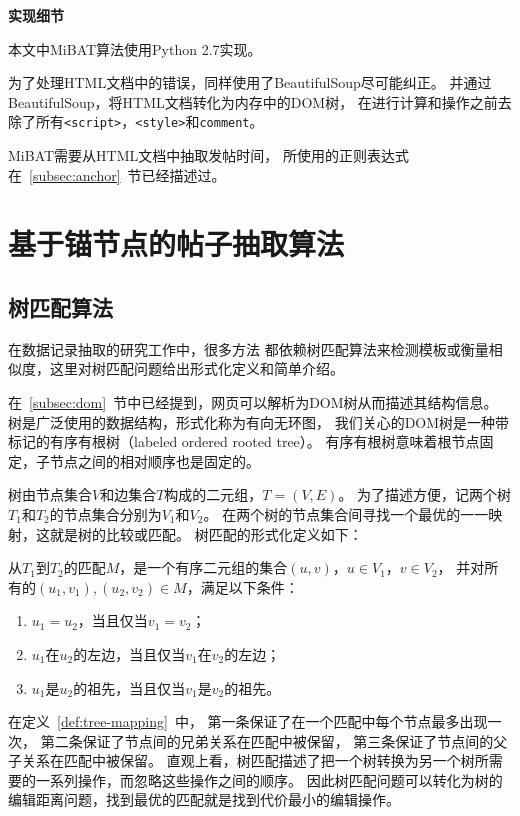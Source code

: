 \textbf{实现细节}

本文中MiBAT算法使用Python 2.7实现。

为了处理HTML文档中的错误，同样使用了BeautifulSoup尽可能纠正。
并通过BeautifulSoup，将HTML文档转化为内存中的DOM树，
在进行计算和操作之前去除了所有\texttt{<script>}，\texttt{<style>}和\texttt{comment}。

MiBAT需要从HTML文档中抽取发帖时间，
所使用的正则表达式在~\ref{subsec:anchor}~节已经描述过。

\section{基于锚节点的帖子抽取算法}
\label{sec:pean-method}

\subsection{树匹配算法}
\label{subsec:tree-match}

在数据记录抽取的研究工作中，很多方法
都依赖树匹配算法来检测模板或衡量相似度，这里对树匹配问题给出形式化定义和简单介绍。

在~\ref{subsec:dom}~节中已经提到，网页可以解析为DOM树从而描述其结构信息。
树是广泛使用的数据结构，形式化称为有向无环图，
我们关心的DOM树是一种带标记的有序有根树（labeled ordered rooted tree）。
有序有根树意味着根节点固定，子节点之间的相对顺序也是固定的。

树由节点集合$V$和边集合$T$构成的二元组，$T=(V,E)$。
为了描述方便，记两个树$T_1$和$T_2$的节点集合分别为$V_1$和$V_2$。
在两个树的节点集合间寻找一个最优的一一映射，这就是树的比较或匹配。
树匹配的形式化定义如下：

\begin{definition}
\label{def:tree-mapping}
从$T_1$到$T_2$的匹配$M$，是一个有序二元组的集合$(u,v)$，$u \in V_1$，$v \in V_2$，
并对所有的$(u_1,v_1), (u_2,v_2) \in M$，满足以下条件：
\begin{enumerate}
\item $u_1 = u_2$，当且仅当$v_1 = v_2$；
\item $u_1$在$u_2$的左边，当且仅当$v_1$在$v_2$的左边；
\item $u_1$是$u_2$的祖先，当且仅当$v_1$是$v_2$的祖先。
\end{enumerate}
\end{definition}

在定义~\ref{def:tree-mapping}~中，
第一条保证了在一个匹配中每个节点最多出现一次，
第二条保证了节点间的兄弟关系在匹配中被保留，
第三条保证了节点间的父子关系在匹配中被保留。
直观上看，树匹配描述了把一个树转换为另一个树所需要的一系列操作，而忽略这些操作之间的顺序。
因此树匹配问题可以转化为树的编辑距离问题，找到最优的匹配就是找到代价最小的编辑操作。

